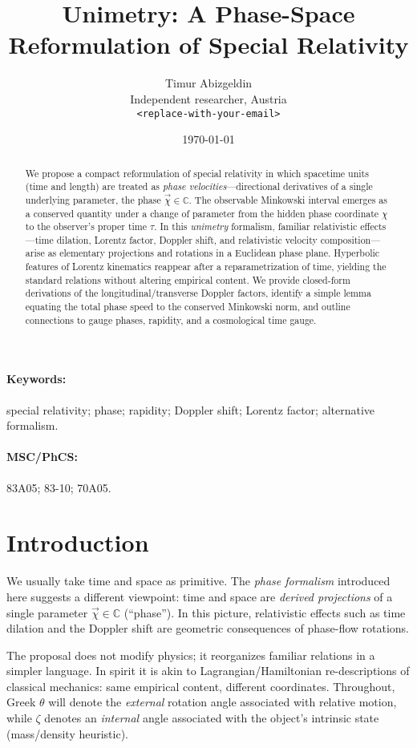 \documentclass[11pt]{article}
\title{Unimetry: A Phase-Space Reformulation of Special Relativity}
\author{Timur Abizgeldin\\ \small Independent researcher, Austria\\ \small \texttt{<replace-with-your-email>}}
\date{\today}
\numberwithin{equation}{section}
\begin{document}
\maketitle

\begin{abstract}
We propose a compact reformulation of special relativity in which spacetime units (time and length) are treated as \emph{phase velocities}---directional derivatives of a single underlying parameter, the phase $\vec{\chi}\in\mathbb{C}$. The observable Minkowski interval emerges as a conserved quantity under a change of parameter from the hidden phase coordinate $\chi$ to the observer's proper time $\tau$. In this \emph{unimetry} formalism, familiar relativistic effects---time dilation, Lorentz factor, Doppler shift, and relativistic velocity composition---arise as elementary projections and rotations in a Euclidean phase plane. Hyperbolic features of Lorentz kinematics reappear after a reparametrization of time, yielding the standard relations without altering empirical content. We provide closed-form derivations of the longitudinal/transverse Doppler factors, identify a simple lemma equating the total phase speed to the conserved Minkowski norm, and outline connections to gauge phases, rapidity, and a cosmological time gauge.
\end{abstract}

\paragraph{Keywords:} special relativity; phase; rapidity; Doppler shift; Lorentz factor; alternative formalism.

\paragraph{MSC/PhCS:} 83A05; 83-10; 70A05.

\section{Introduction}
We usually take time and space as primitive. The \emph{phase formalism} introduced here suggests a different viewpoint: time and space are \emph{derived projections} of a single parameter $\vec{\chi}\in\mathbb{C}$ (``phase''). In this picture, relativistic effects such as time dilation and the Doppler shift are geometric consequences of phase-flow rotations.

The proposal does not modify physics; it reorganizes familiar relations in a simpler language. In spirit it is akin to Lagrangian/Hamiltonian re-descriptions of classical mechanics: same empirical content, different coordinates. Throughout, Greek $\theta$ will denote the \emph{external} rotation angle associated with relative motion, while $\zeta$ denotes an \emph{internal} angle associated with the object's intrinsic state (mass/density heuristic).
\end{document}
